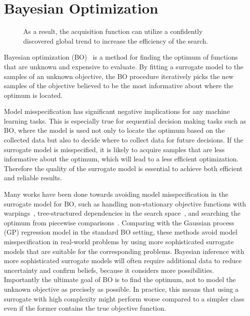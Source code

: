 \section{Bayesian Optimization}
\label{toc:discussion:bo}
\begin{figure}[t]
    \centering
    \caption{
        \label{fig:bo:posterior}
        As a result, the acquisition function can utilize a confidently discovered global trend to increase the efficiency of the search.
    }
\end{figure}
Bayesian optimization (BO)~\cite{snoek2012practical} is a method for finding the optimum of functions that are unknown and expensive to evaluate.
By fitting a surrogate model to the samples of an unknown objective, the BO procedure iteratively picks the new samples of the objective believed to be the most informative about where the optimum is located.

Model misspecification has significant negative implications for any machine learning tasks.
This is especially true for sequential decision making tasks such as BO, where the model is used not only to locate the optimum based on the collected data but also to decide where to collect data for future decisions.
If the surrogate model is misspecified, it is likely to acquire samples that are less informative about the optimum, which will lead to a less efficient optimization.
Therefore the quality of the surrogate model is essential to achieve both efficient and reliable results.

Many works have been done towards avoiding model misspecification in the surrogate model for BO, such as handling non-stationary objective functions with warpings~\cite{snoek2014input}, tree-structured dependencies in the search space~\cite{jenatton2017bayesian}, and searching the optimum from piecewise comparisons~\cite{gonzalez2017preferential}.
Comparing with the Gaussian process (GP) regression model in the standard BO setting, these methods avoid model misspecification in real-world problems by using more sophisticated surrogate models that are suitable for the corresponding problems.
Bayesian inference with more sophisticated surrogate models will often require additional data to reduce uncertainty and confirm beliefs, because it considers more possibilities.
Importantly the ultimate goal of BO is to find the optimum, not to model the unknown objective as precisely as possible.
In practice, this means that using a surrogate with high complexity might perform worse compared to a simpler class
even if the former contains the true objective function.

